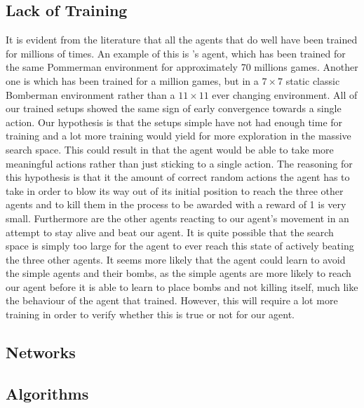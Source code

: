 \subsection{Lack of Training}
It is evident from the literature that all the agents that do well have been trained for millions of times. An example of this is \cite{rwightman}'s agent, which has been trained for the same Pommerman environment for approximately 70 millions games. Another one is \cite{kormelink2018exploration} which has been trained for a million games, but in a $7 \times 7$ static classic Bomberman environment rather than a $11 \times 11$ ever changing environment. All of our trained setups showed the same sign of early convergence towards a single action. Our hypothesis is that the setups simple have not had enough time for training and a lot more training would yield for more exploration in the massive search space. This could result in that the agent would be able to take more meaningful actions rather than just sticking to a single action. The reasoning for this hypothesis is that it the amount of correct random actions the agent has to take in order to blow its way out of its initial position to reach the three other agents and to kill them in the process to be awarded with a reward of 1 is very small. Furthermore are the other agents reacting to our agent's movement in an attempt to stay alive and beat our agent. It is quite possible that the search space is simply too large for the agent to ever reach this state of actively beating the three other agents. It seems more likely that the agent could learn to avoid the simple agents and their bombs, as the simple agents are more likely to reach our agent before it is able to learn to place bombs and not killing itself, much like the behaviour of the agent that \cite{rwightman} trained. However, this will require a lot more training in order to verify whether this is true or not for our agent.

\subsection{Networks}

\subsection{Algorithms}
